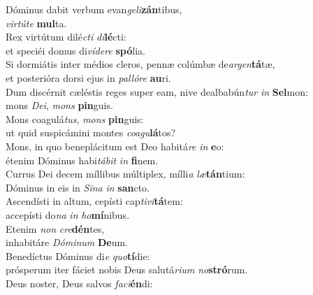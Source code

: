 \evenverse Dóminus dabit verbum evan\textit{ge}\textit{li}\textbf{zán}tibus,~\*\\
\evenverse \textit{vir}\textit{tú}\textit{te} \textbf{mul}ta.\\
\oddverse Rex virtútum dilé\textit{cti} \textit{di}\textbf{lé}cti:~\*\\
\oddverse et speciéi domus di\textit{ví}\textit{de}\textit{re} \textbf{spó}lia.\\
\evenverse Si dormiátis inter médios cleros, pennæ colúmbæ de\textit{ar}\textit{gen}\textbf{tá}tæ,~\*\\
\evenverse et posterióra dorsi ejus in \textit{pal}\textit{ló}\textit{re} \textbf{au}ri.\\
\oddverse Dum discérnit cæléstis reges super eam, nive dealbabún\textit{tur} \textit{in} \textbf{Sel}mon:~\*\\
\oddverse mons \textit{De}\textit{i}, \textit{mons} \textbf{pin}guis.\\
\evenverse Mons coagulá\textit{tus}, \textit{mons} \textbf{pin}guis:~\*\\
\evenverse ut quid suspicámini montes \textit{co}\textit{a}\textit{gu}\textbf{lá}tos?\\
\oddverse Mons, in quo beneplácitum est Deo habitá\textit{re} \textit{in} \textbf{e}o:~\*\\
\oddverse étenim Dóminus habi\textit{tá}\textit{bit} \textit{in} \textbf{fi}nem.\\
\evenverse Currus Dei decem míllibus múltiplex, mílli\textit{a} \textit{læ}\textbf{tán}tium:~\*\\
\evenverse Dóminus in eis in \textit{Si}\textit{na} \textit{in} \textbf{san}cto.\\
\oddverse Ascendísti in altum, cepísti cap\textit{ti}\textit{vi}\textbf{tá}tem:~\*\\
\oddverse accepísti do\textit{na} \textit{in} \textit{ho}\textbf{mí}nibus.\\
\evenverse Etenim \textit{non} \textit{cre}\textbf{dén}tes,~\*\\
\evenverse inhabitáre \textit{Dó}\textit{mi}\textit{num} \textbf{De}um.\\
\oddverse Benedíctus Dóminus di\textit{e} \textit{quo}\textbf{tí}die:~\*\\
\oddverse prósperum iter fáciet nobis Deus salutá\textit{ri}\textit{um} \textit{no}\textbf{stró}rum.\\
\evenverse Deus noster, Deus salvos \textit{fa}\textit{ci}\textbf{én}di:~\*\\
